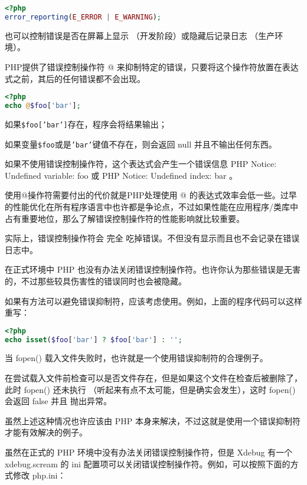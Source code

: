 \begin{lstlisting}[language=PHP]
<?php
error_reporting(E_ERROR | E_WARNING);
\end{lstlisting}

也可以控制错误是否在屏幕上显示 （开发阶段）或隐藏后记录日志 （生产环境）。

PHP提供了错误控制操作符 @ 来抑制特定的错误，只要将这个操作符放置在表达式之前，其后的任何错误都不会出现。



\begin{lstlisting}[language=PHP]
<?php
echo @$foo['bar'];
\end{lstlisting}

\begin{compactitem}
\item 如果\texttt{\$foo['bar']}存在，程序会将结果输出；
\item 如果变量\texttt{\$foo}或是\texttt{'bar'}键值不存在，则会返回 null 并且不输出任何东西。
\end{compactitem}


如果不使用错误控制操作符，这个表达式会产生一个错误信息 PHP Notice: Undefined variable: foo 或 PHP Notice: Undefined index: bar 。

使用@操作符需要付出的代价就是PHP处理使用 @ 的表达式效率会低一些。过早的性能优化在所有程序语言中也许都是争论点，不过如果性能在应用程序/类库中占有重要地位，那么了解错误控制操作符的性能影响就比较重要。

实际上，错误控制操作符会 完全 吃掉错误。不但没有显示而且也不会记录在错误日志中。

在正式环境中 PHP 也没有办法关闭错误控制操作符。也许你认为那些错误是无害的，不过那些较具伤害性的错误同时也会被隐藏。

如果有方法可以避免错误抑制符，应该考虑使用。例如，上面的程序代码可以这样重写：

\begin{lstlisting}[language=PHP]
<?php
echo isset($foo['bar'] ? $foo['bar'] : '';
\end{lstlisting}

当 fopen() 载入文件失败时，也许就是一个使用错误抑制符的合理例子。

在尝试载入文件前检查可以是否文件存在，但是如果这个文件在检查后被删除了，此时 fopen() 还未执行 （听起来有点不太可能，但是确实会发生），这时 fopen() 会返回 false 并且 抛出异常。

虽然上述这种情况也许应该由 PHP 本身来解决，不过这就是使用一个错误抑制符才能有效解决的例子。

虽然在正式的 PHP 环境中没有办法关闭错误控制操作符，但是 Xdebug 有一个 xdebug.scream 的 ini 配置项可以关闭错误控制操作符。例如，可以按照下面的方式修改 php.ini：


